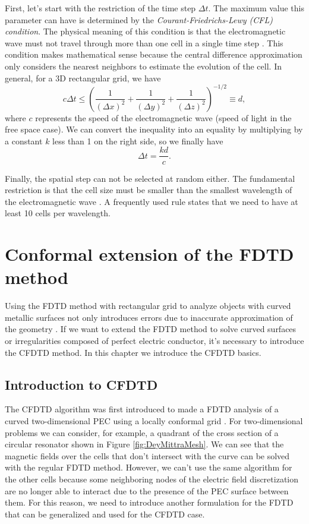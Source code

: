\documentclass[12pt, oneside]{book}
\begin{document}
\indent First, let's start with the restriction of the time step $\Delta t$. The maximum value this parameter can have is determined by the \textit{Courant-Friedrichs-Lewy (CFL) condition}. The physical meaning of this condition is that the electromagnetic wave must not travel through more than one cell in a single time step \cite{kunz1993finite}. This condition makes mathematical sense because the central difference approximation only considers the nearest neighbors to estimate the evolution of the cell. In general, for a 3D rectangular grid, we have
\begin{equation}
    c \Delta t \leq \left( \dfrac{1}{(\Delta x)^2} + \dfrac{1}{(\Delta y)^2} + \dfrac{1}{(\Delta z)^2} \right)^{-1/2} \equiv d,
\end{equation}
where $c$ represents the speed of the electromagnetic wave (speed of light in the free space case). We can convert the inequality into an equality by multiplying by a constant $k$ less than 1 on the right side, so we finally have
\begin{equation}
    \Delta t = \dfrac{kd}{c}.
    \label{eq:CFL}
\end{equation}

Finally, the spatial step can not be selected at random either. The fundamental restriction is that the cell size must be smaller than the smallest wavelength of the electromagnetic wave \cite{kunz1993finite}. A frequently used rule states that we need to have at least 10 cells per wavelength.

\chapter{Conformal extension of the FDTD method}

Using the FDTD method with rectangular grid to analyze objects with curved metallic surfaces not only introduces errors due to inaccurate approximation of the geometry \cite{97384}. If we want to extend the FDTD method to solve curved surfaces or irregularities composed of perfect electric conductor, it's necessary to introduce the CFDTD method. In this chapter we introduce the CFDTD basics.

\section{Introduction to CFDTD}

The CFDTD algorithm was first introduced to made a FDTD analysis of a curved two-dimensional PEC using a locally conformal grid \cite{DeyMittra1997}. For two-dimensional problems we can consider, for example, a quadrant of the cross section of a circular resonator shown in Figure \ref{fig:DeyMittraMesh}. We can see that the magnetic fields over the cells that don't intersect with the curve can be solved with the regular FDTD method. However, we can't use the same algorithm for the other cells because some neighboring nodes of the electric field discretization are no longer able to interact due to the presence of the PEC surface between them. For this reason, we need to introduce another formulation for the FDTD that can be generalized and used for the CFDTD case.
\end{document}
